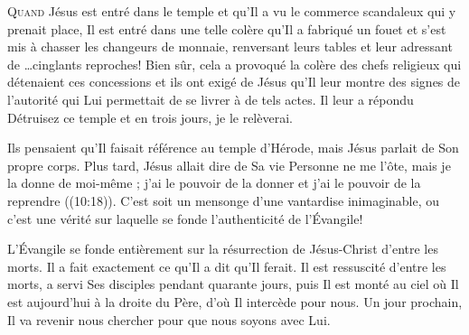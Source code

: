 



\lettrine{Q}{uand} Jésus est entré dans le temple et qu'Il a vu le commerce
 scandaleux qui y prenait place, Il est entré dans une telle colère
 qu'Il a fabriqué un fouet et s'est mis à chasser les changeurs
 de monnaie, renversant leurs tables et leur adressant
 de \dots cinglants reproches!
 Bien sûr, cela a provoqué la colère des chefs religieux
 qui détenaient ces concessions et ils ont exigé de Jésus
 qu'Il leur montre des signes de l'autorité qui Lui permettait
 de se livrer à de tels actes.
 Il leur a répondu\frcolon{} 
 \Og Détruisez ce temple et en trois jours, je le relèverai. \Fg{}

Ils pensaient qu'Il faisait référence au temple d'Hérode,
 mais Jésus parlait de Son propre corps.
 Plus tard, Jésus allait dire de Sa vie\frcolon{} 
 \Og Personne ne me l'ôte, mais je la donne de moi-même ;
 j'ai le pouvoir de la donner et j'ai le pouvoir de la reprendre \Fg{}
 ((10:18)).
 C'est soit un mensonge d'une vantardise inimaginable,
 ou c'est une vérité sur laquelle se fonde
 l'authenticité de l'Évangile!


L'Évangile se fonde entièrement sur la résurrection
 de Jésus-Christ d'entre les morts.
 Il a fait exactement ce qu'Il a dit qu'Il ferait.
 Il est ressuscité d'entre les morts, a servi Ses disciples
 pendant quarante jours, puis Il est monté au ciel
 où Il est aujourd'hui à la droite du Père,
 d'où Il intercède pour nous.
 Un jour prochain, Il va revenir nous chercher
 pour que nous soyons avec Lui.

\dvrule



